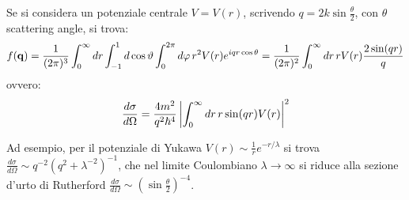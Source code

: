 \begin{example}
	Se si considera un potenziale centrale $ V = V(r) $, scrivendo $ q = 2k \sin \frac{\theta}{2} $, con $ \theta $ scattering angle, si trova:
	\begin{equation*}
		f(\mathbf{q}) = \frac{1}{(2\pi)^3} \int_0^\infty dr \int_{-1}^1 d \cos \vartheta \int_0^{2\pi} d \varphi\, r^2 V(r) e^{i qr \cos \theta} = \frac{1}{(2\pi)^2} \int_0^\infty dr\, r V(r) \frac{2 \sin (qr)}{q}
	\end{equation*}
	ovvero:
	\begin{equation*}
		\frac{d \sigma}{d \Omega} = \frac{4m^2}{q^2 \hbar^4} \left\lvert \int_0^\infty dr\, r \sin(qr) V(r) \right\rvert^2
	\end{equation*}
\end{example}
Ad esempio, per il potenziale di Yukawa $ V(r) \sim \frac{1}{r} e^{-r / \lambda} $ si trova $ \frac{d \sigma}{d \Omega} \sim q^{-2} (q^2 + \lambda^{-2})^{-1} $, che nel limite Coulombiano $ \lambda \rightarrow \infty $ si riduce alla sezione d'urto di Rutherford $ \frac{d \sigma}{d \Omega} \sim \left( \sin \frac{\theta}{2} \right)^{-4} $.










